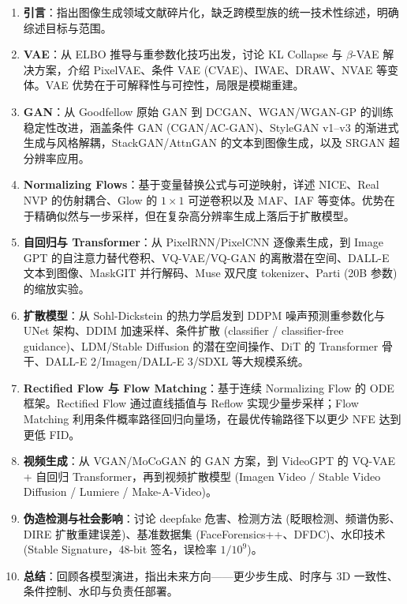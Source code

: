\documentclass[11pt,a4paper]{ctexart}
\begin{document}
\begin{enumerate}[leftmargin=*, itemsep=2pt]
    \item[\S1] \textbf{引言}：指出图像生成领域文献碎片化，缺乏跨模型族的统一技术性综述，明确综述目标与范围。
    \item[\S2] \textbf{VAE}：从 ELBO 推导与重参数化技巧出发，讨论 KL Collapse 与 $\beta$-VAE 解决方案，介绍 PixelVAE、条件 VAE (CVAE)、IWAE、DRAW、NVAE 等变体。VAE 优势在于可解释性与可控性，局限是模糊重建。
    \item[\S3] \textbf{GAN}：从 Goodfellow 原始 GAN 到 DCGAN、WGAN/WGAN-GP 的训练稳定性改进，涵盖条件 GAN (CGAN/AC-GAN)、StyleGAN v1--v3 的渐进式生成与风格解耦，StackGAN/AttnGAN 的文本到图像生成，以及 SRGAN 超分辨率应用。
    \item[\S4] \textbf{Normalizing Flows}：基于变量替换公式与可逆映射，详述 NICE、Real NVP 的仿射耦合、Glow 的 $1\times1$ 可逆卷积以及 MAF、IAF 等变体。优势在于精确似然与一步采样，但在复杂高分辨率生成上落后于扩散模型。
    \item[\S5] \textbf{自回归与 Transformer}：从 PixelRNN/PixelCNN 逐像素生成，到 Image GPT 的自注意力替代卷积、VQ-VAE/VQ-GAN 的离散潜在空间、DALL-E 文本到图像、MaskGIT 并行解码、Muse 双尺度 tokenizer、Parti (20B 参数) 的缩放实验。
    \item[\S6] \textbf{扩散模型}：从 Sohl-Dickstein 的热力学启发到 DDPM 噪声预测重参数化与 UNet 架构、DDIM 加速采样、条件扩散 (classifier / classifier-free guidance)、LDM/Stable Diffusion 的潜在空间操作、DiT 的 Transformer 骨干、DALL-E 2/Imagen/DALL-E 3/SDXL 等大规模系统。
    \item[\S7] \textbf{Rectified Flow 与 Flow Matching}：基于连续 Normalizing Flow 的 ODE 框架。Rectified Flow 通过直线插值与 Reflow 实现少量步采样；Flow Matching 利用条件概率路径回归向量场，在最优传输路径下以更少 NFE 达到更低 FID。
    \item[\S8] \textbf{视频生成}：从 VGAN/MoCoGAN 的 GAN 方案，到 VideoGPT 的 VQ-VAE + 自回归 Transformer，再到视频扩散模型 (Imagen Video / Stable Video Diffusion / Lumiere / Make-A-Video)。
    \item[\S9] \textbf{伪造检测与社会影响}：讨论 deepfake 危害、检测方法 (眨眼检测、频谱伪影、DIRE 扩散重建误差)、基准数据集 (FaceForensics++、DFDC)、水印技术 (Stable Signature，48-bit 签名，误检率 $1/10^9$)。
    \item[\S10] \textbf{总结}：回顾各模型演进，指出未来方向——更少步生成、时序与 3D 一致性、条件控制、水印与负责任部署。
\end{enumerate}

\end{document}
